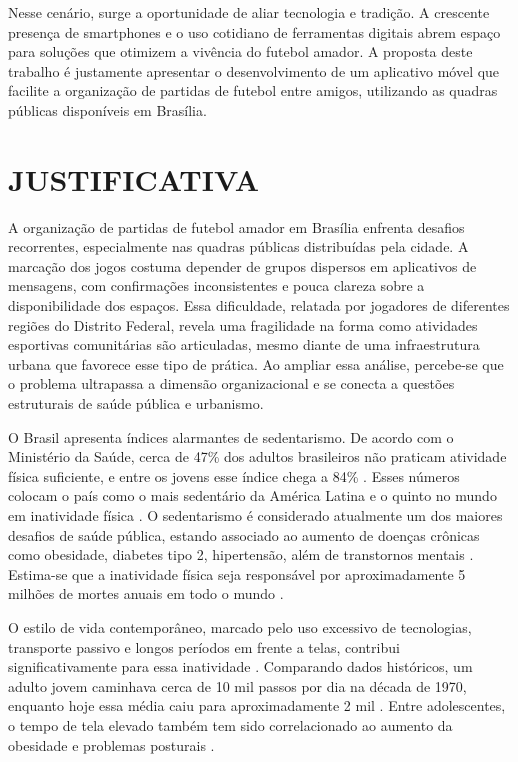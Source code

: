 Nesse cenário, surge a oportunidade de aliar tecnologia e tradição. A crescente presença de smartphones e o uso cotidiano de ferramentas digitais abrem espaço para soluções que otimizem a vivência do futebol amador. A proposta deste trabalho é justamente apresentar o desenvolvimento de um aplicativo móvel que facilite a organização de partidas de futebol entre amigos, utilizando as quadras públicas disponíveis em Brasília.

\section{JUSTIFICATIVA}

A organização de partidas de futebol amador em Brasília enfrenta desafios recorrentes, especialmente nas quadras públicas distribuídas pela cidade. A marcação dos jogos costuma depender de grupos dispersos em aplicativos de mensagens, com confirmações inconsistentes e pouca clareza sobre a disponibilidade dos espaços. Essa dificuldade, relatada por jogadores de diferentes regiões do Distrito Federal, revela uma fragilidade na forma como atividades esportivas comunitárias são articuladas, mesmo diante de uma infraestrutura urbana que favorece esse tipo de prática. Ao ampliar essa análise, percebe-se que o problema ultrapassa a dimensão organizacional e se conecta a questões estruturais de saúde pública e urbanismo.

O Brasil apresenta índices alarmantes de sedentarismo. De acordo com o Ministério da Saúde, cerca de 47\% dos adultos brasileiros não praticam atividade física suficiente, e entre os jovens esse índice chega a 84\% \cite{ministerio2023,saraiva2024}. Esses números colocam o país como o mais sedentário da América Latina e o quinto no mundo em inatividade física \cite{oms2023,bvsms2023}. O sedentarismo é considerado atualmente um dos maiores desafios de saúde pública, estando associado ao aumento de doenças crônicas como obesidade, diabetes tipo 2, hipertensão, além de transtornos mentais \cite{bvsms2023,oms2023}. Estima-se que a inatividade física seja responsável por aproximadamente 5 milhões de mortes anuais em todo o mundo \cite{oms2023}.

O estilo de vida contemporâneo, marcado pelo uso excessivo de tecnologias, transporte passivo e longos períodos em frente a telas, contribui significativamente para essa inatividade \cite{saraiva2024}. Comparando dados históricos, um adulto jovem caminhava cerca de 10 mil passos por dia na década de 1970, enquanto hoje essa média caiu para aproximadamente 2 mil \cite{saraiva2024}. Entre adolescentes, o tempo de tela elevado também tem sido correlacionado ao aumento da obesidade e problemas posturais \cite{saraiva2024}.


